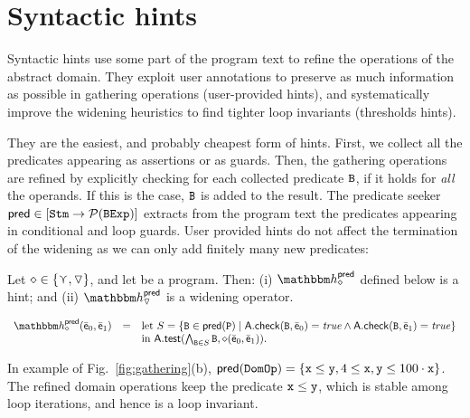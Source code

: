 \documentclass{llncs}
\begin{document}
\section{Syntactic hints}
Syntactic hints use some part of the program text to refine the operations of the abstract domain.
They exploit user annotations to preserve as much information as possible in gathering operations (user-provided hints), and systematically improve the widening heuristics to find tighter loop invariants (thresholds hints).


They are the easiest, and probably cheapest form of hints.
First, we collect all the predicates appearing as assertions or as guards.
Then, the gathering operations are refined by explicitly checking for each collected predicate $\mathtt{B}$, if it holds for \emph{all} the operands.
If this is the case, $\mathtt{B}$ is  added to the result.
The predicate seeker $\mathsf{pred} \in [\mathtt{Stm} \rightarrow\mathcal{P}{(\mathtt{BExp})}]$ extracts from the program text the predicates appearing in conditional and loop guards.
User provided hints do not affect the termination of the widening as  we can only add finitely many new predicates:

\begin{lemma}
\label{sect:syntactic}
Let $\diamond \in \{ \curlyvee, \triangledown\}$, and let  be a program. 
Then: (i) $\hint{\diamond}^{\mathsf{pred}}$ defined below is a hint;
and (ii) $\hint{\widening}^{\mathsf{pred}}$ is a widening operator.


\begin{small}
\[
\begin{array}{rcl}
\hint{\diamond}^{\mathsf{pred}}(\ael{e}_0, \ael{e}_1) &=&
\mathrm{let}\ S = \{ \code{B} \in \mathsf{pred}(\code{P}) \mid
\dom{A}.\checkif(\code{B}, \ael{e}_0) = \mathit{true} \wedge \dom{A}.\checkif(\code{B}, \ael{e}_1) = \mathit{true}   \} \\
& & \mathrm{in}\ \dom{A}.\guard(\bigwedge_{\code{B} \in S} \code{B}, \diamond(\ael{e}_0, \ael{e}_1)).
\end{array}
\]
\end{small}
\end{lemma}


In example of Fig.~\ref{fig:gathering}(b), $\mathsf{pred}(\mathtt{DomOp}) = \{ \mathtt{x} \leq \mathtt{y}, 4 \leq \mathtt{x}, \mathtt{y} \leq 100 \cdot \mathtt{x} \}$.
The refined domain operations keep the predicate $\mathtt{x} \leq \mathtt{y}$, which is stable among loop iterations, and hence is  a loop invariant.%
\end{document}
